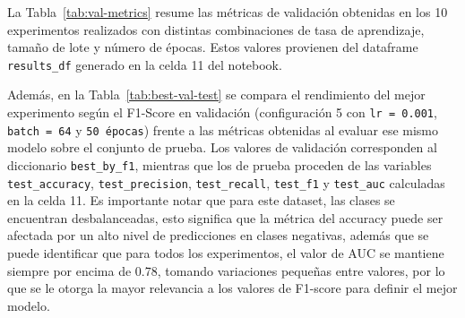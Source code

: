 \documentclass[conference]{IEEEtran}
\begin{document}
La Tabla~\ref{tab:val-metrics} resume las métricas de validación obtenidas en los 10 experimentos realizados con distintas combinaciones de tasa de aprendizaje, tamaño de lote y número de épocas. Estos valores provienen del dataframe \texttt{results\_df} generado en la celda 11 del notebook.

\begin{table}[ht]
    \centering
    \caption{Métricas de validación por experimento de entrenamiento (accuracy, precisión, recall, F1 y AUC).}
    \label{tab:val-metrics}
\end{table}

Además, en la Tabla~\ref{tab:best-val-test} se compara el rendimiento del mejor experimento según el F1-Score en validación (configuración 5 con \texttt{lr = 0.001}, \texttt{batch = 64} y \texttt{50 épocas}) frente a las métricas obtenidas al evaluar ese mismo modelo sobre el conjunto de prueba. Los valores de validación corresponden al diccionario \texttt{best\_by\_f1}, mientras que los de prueba proceden de las variables \texttt{test\_accuracy}, \texttt{test\_precision}, \texttt{test\_recall}, \texttt{test\_f1} y \texttt{test\_auc} calculadas en la celda 11. Es importante notar que para este dataset, las clases se encuentran desbalanceadas, esto significa que la métrica del accuracy puede ser afectada por un alto nivel de predicciones en clases negativas, además que se puede identificar que para todos los experimentos, el valor de AUC se mantiene siempre por encima de 0.78, tomando variaciones pequeñas entre valores, por lo que se le otorga la mayor relevancia a los valores de F1-score para definir el mejor modelo.
\end{document}
